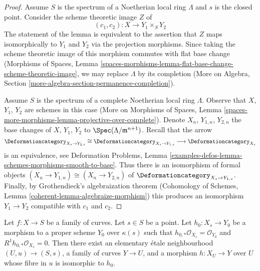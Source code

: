 \begin{proof}
\medskip\noindent
Assume $S$ is the spectrum of a Noetherian local ring $\Lambda$ and
$s$ is the closed point. Consider the scheme theoretic image $Z$ of
$$
(c_1, c_2) : X \longrightarrow Y_1 \times_S Y_2
$$
The statement of the lemma is equivalent to the assertion that $Z$ maps
isomorphically to $Y_1$ and $Y_2$ via the projection morphisms.
Since taking the scheme theoretic image of this morphism commutes
with flat base change (Morphisms of Spaces, Lemma
\ref{spaces-morphisms-lemma-flat-base-change-scheme-theoretic-image},
we may replace $\Lambda$ by its completion
(More on Algebra, Section \ref{more-algebra-section-permanence-completion}).

\medskip\noindent
Assume $S$ is the spectrum of a complete Noetherian local ring $\Lambda$.
Observe that $X$, $Y_1$, $Y_2$ are schemes in this case
(More on Morphisms of Spaces, Lemma
\ref{spaces-more-morphisms-lemma-projective-over-complete}).
Denote $X_n$, $Y_{1, n}$, $Y_{2, n}$ the base changes of
$X$, $Y_1$, $Y_2$ to $\Spec(\Lambda/\mathfrak m^{n + 1})$.
Recall that the arrow
$$
\Deformationcategory_{X_s \to Y_{2, s}} \cong
\Deformationcategory_{X_s \to Y_{1, s}} \longrightarrow
\Deformationcategory_{X_s}
$$
is an equivalence, see Deformation Problems, Lemma
\ref{examples-defos-lemma-schemes-morphisms-smooth-to-base}.
Thus there is an isomorphism of formal objects
$(X_n \to Y_{1, n}) \cong (X_n \to Y_{2, n})$
of $\Deformationcategory_{X_s \to Y_{1, s}}$.
Finally, by Grothendieck's algebraization theorem
(Cohomology of Schemes, Lemma \ref{coherent-lemma-algebraize-morphism})
this produces an isomorphism $Y_1 \to Y_2$ compatible with $c_1$ and $c_2$.
\end{proof}

\begin{lemma}
\label{lemma-contract-basic}
Let $f : X \to S$ be a family of curves. Let $s \in S$ be a point.
Let $h_0 : X_s \to Y_0$ be a morphism to a proper scheme $Y_0$ over $\kappa(s)$
such that $h_{0, *}\mathcal{O}_{X_s} = \mathcal{O}_{Y_0}$ and
$R^1h_{0, *}\mathcal{O}_{X_s} = 0$. Then there exist an elementary
\'etale neighbourhood $(U, u) \to (S, s)$, a family of curves $Y \to U$,
and a morphism $h : X_U \to Y$ over $U$ whose fibre in $u$
is isomorphic to $h_0$.
\end{lemma}

